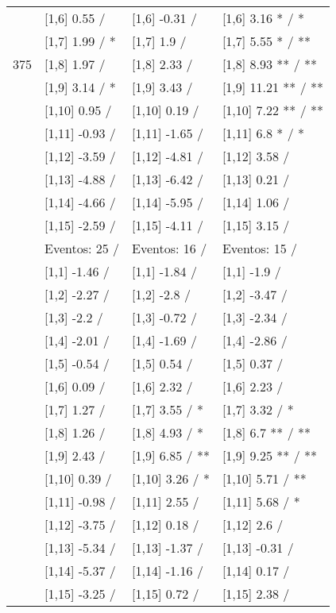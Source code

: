 \begin{table}
\begin{tabular}[t]{llll}
 & {}[1,6] 0.55  / & {}[1,6] -0.31  / & {}[1,6] 3.16 * / *\\
 & {}[1,7] 1.99  / * & {}[1,7] 1.9  / & {}[1,7] 5.55 * / **\\
375 & {}[1,8] 1.97  / & {}[1,8] 2.33  / & {}[1,8] 8.93 ** / **\\
\addlinespace
 & {}[1,9] 3.14  / * & {}[1,9] 3.43  / & {}[1,9] 11.21 ** / **\\
 & {}[1,10] 0.95  / & {}[1,10] 0.19  / & {}[1,10] 7.22 ** / **\\
 & {}[1,11] -0.93  / & {}[1,11] -1.65  / & {}[1,11] 6.8 * / *\\
 & {}[1,12] -3.59  / & {}[1,12] -4.81  / & {}[1,12] 3.58  /\\
 & {}[1,13] -4.88  / & {}[1,13] -6.42  / & {}[1,13] 0.21  /\\
\addlinespace
 & {}[1,14] -4.66  / & {}[1,14] -5.95  / & {}[1,14] 1.06  /\\
 & {}[1,15] -2.59  / & {}[1,15] -4.11  / & {}[1,15] 3.15  /\\
 & Eventos:  25 / & Eventos:  16 / & Eventos:  15 /\\
 & {}[1,1] -1.46  / & {}[1,1] -1.84  / & {}[1,1] -1.9  /\\
 & {}[1,2] -2.27  / & {}[1,2] -2.8  / & {}[1,2] -3.47  /\\
\addlinespace
 & {}[1,3] -2.2  / & {}[1,3] -0.72  / & {}[1,3] -2.34  /\\
 & {}[1,4] -2.01  / & {}[1,4] -1.69  / & {}[1,4] -2.86  /\\
 & {}[1,5] -0.54  / & {}[1,5] 0.54  / & {}[1,5] 0.37  /\\
 & {}[1,6] 0.09  / & {}[1,6] 2.32  / & {}[1,6] 2.23  /\\
 & {}[1,7] 1.27  / & {}[1,7] 3.55  / * & {}[1,7] 3.32  / *\\
\addlinespace
500 & {}[1,8] 1.26  / & {}[1,8] 4.93  / * & {}[1,8] 6.7 ** / **\\
 & {}[1,9] 2.43  / & {}[1,9] 6.85  / ** & {}[1,9] 9.25 ** / **\\
 & {}[1,10] 0.39  / & {}[1,10] 3.26  / * & {}[1,10] 5.71  / **\\
 & {}[1,11] -0.98  / & {}[1,11] 2.55  / & {}[1,11] 5.68  / *\\
 & {}[1,12] -3.75  / & {}[1,12] 0.18  / & {}[1,12] 2.6  /\\
\addlinespace
 & {}[1,13] -5.34  / & {}[1,13] -1.37  / & {}[1,13] -0.31  /\\
 & {}[1,14] -5.37  / & {}[1,14] -1.16  / & {}[1,14] 0.17  /\\
 & {}[1,15] -3.25  / & {}[1,15] 0.72  / & {}[1,15] 2.38  /\\
\bottomrule
\end{tabular}
\end{table}
